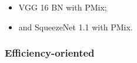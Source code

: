 \begin{itemize}
	\item VGG 16 BN with \gls{PMix};
	\item and SqueezeNet 1.1 with \gls{PMix}.
\end{itemize}








\FloatBarrier

\subsubsection{Efficiency-oriented}

